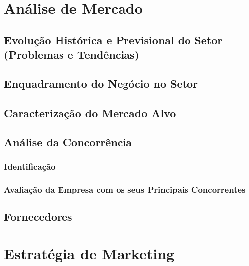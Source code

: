 \documentclass[11pt]{article}
\begin{document}
	\large
	\section{Análise de Mercado}
	
	\normalsize
	
	
	\large
	\subsection{Evolução Histórica e Previsional do Setor (Problemas e Tendências)}
	
	\normalsize
	
	\large
	\subsection{Enquadramento do Negócio no Setor}
	
	\normalsize
	
	
	\large
	\subsection{Caracterização do Mercado Alvo}
	
	\normalsize
	
	
	\large
	\subsection{Análise da Concorrência}
	
	\normalsize
	
	
	\large
	\subsubsection{Identificação}
	
	\normalsize
	
	
	\large
	\subsubsection{Avaliação da Empresa com os seus Principais Concorrentes}
	
	\normalsize
	
	
	\large
	\subsection{Fornecedores}
	
	\normalsize
	
	\pagebreak
	
	\large
	\section{Estratégia de Marketing}
	
\end{document}
